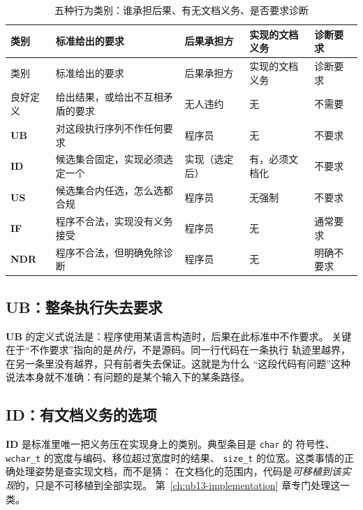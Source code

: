 \documentclass[12pt,a4paper,fontset=fandol]{ctexbook}
\newcommand{\Tp}[1]{\texttt{#1}}
\newcommand{\UB}{\textbf{\textsf{UB}}}
\newcommand{\IDB}{\textbf{\textsf{ID}}}
\newcommand{\USB}{\textbf{\textsf{US}}}
\newcommand{\NDR}{\textbf{\textsf{NDR}}}
\newcommand{\ILLF}{\textbf{\textsf{IF}}}
\begin{document}
\begin{longtable}{@{}>{\raggedright\arraybackslash}p{} >{\raggedright\arraybackslash}p{} >{\raggedright\arraybackslash}p{} >{\raggedright\arraybackslash}p{} >{\raggedright\arraybackslash}p{}@{}}
\caption{五种行为类别：谁承担后果、有无文档义务、是否要求诊断}\label{tab:ub01-kinds}\\
\toprule
类别 & 标准给出的要求 & 后果承担方 & 实现的文档义务 & 诊断要求 \\
\midrule
\endfirsthead
\toprule
类别 & 标准给出的要求 & 后果承担方 & 实现的文档义务 & 诊断要求 \\
\midrule
\endhead
\bottomrule
\endfoot
良好定义 & 给出结果，或给出不互相矛盾的要求 & 无人违约 & 无 & 不需要 \\
\UB{} & 对这段执行序列不作任何要求 & 程序员 & 无 & 不要求 \\
\IDB{} & 候选集合固定，实现必须选定一个 & 实现（选定后） & 有，必须文档化 & 不要求 \\
\USB{} & 候选集合内任选，怎么选都合规 & 程序员 & 无强制 & 不要求 \\
\ILLF{} & 程序不合法，实现没有义务接受 & 程序员 & 无 & 通常要求 \\
\NDR{} & 程序不合法，但明确免除诊断 & 程序员 & 无 & 明确不要求 \\
\end{longtable}

\subsection{UB：整条执行失去要求}\label{sec:ub01-ub}

\UB{} 的定义式说法是：程序使用某语言构造时，后果在此标准中不作要求。
关键在于“不作要求”指向的是\emph{执行}，不是源码。同一行代码在一条执行
轨迹里越界，在另一条里没有越界，只有前者失去保证。这就是为什么
“这段代码有问题”这种说法本身就不准确：有问题的是某个输入下的某条路径。

\subsection{ID：有文档义务的选项}\label{sec:ub01-idb}

\IDB{} 是标准里唯一把义务压在实现身上的类别。典型条目是 \Tp{char} 的
符号性、\Tp{wchar\_t} 的宽度与编码、移位超过宽度时的结果、
\Tp{size\_t} 的位宽。这类事情的正确处理姿势是查实现文档，而不是猜：
在文档化的范围内，代码是\emph{可移植到该实现}的，只是不可移植到全部实现。
第~\ref{ch:ub13-implementation} 章专门处理这一类。
\end{document}

